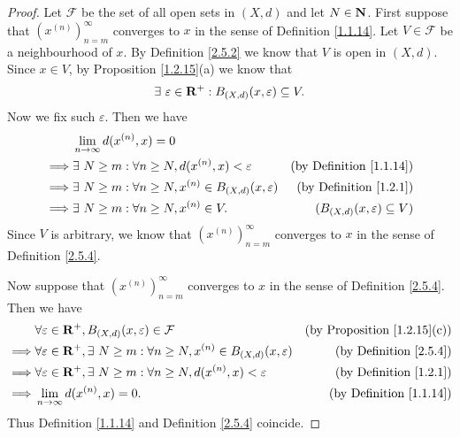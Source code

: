 \begin{proof}
    Let \(\mathcal{F}\) be the set of all open sets in \((X, d)\) and let \(N \in \mathbf{N}\).
    First suppose that \((x^{(n)})_{n = m}^\infty\) converges to \(x\) in the sense of Definition \ref{1.1.14}.
    Let \(V \in \mathcal{F}\) be a neighbourhood of \(x\).
    By Definition \ref{2.5.2} we know that \(V\) is open in \((X, d)\).
    Since \(x \in V\), by Proposition \ref{1.2.15}(a) we know that
    \[
        \exists\ \varepsilon \in \mathbf{R}^+ : B_{(X, d)}(x, \varepsilon) \subseteq V.
    \]
    Now we fix such \(\varepsilon\).
    Then we have
    \begin{align*}
                 & \lim_{n \to \infty} d(x^{(n)}, x) = 0                                                                                   \\
        \implies & \exists\ N \geq m : \forall n \geq N, d(x^{(n)}, x) < \varepsilon            & \text{(by Definition \ref{1.1.14})}      \\
        \implies & \exists\ N \geq m : \forall n \geq N, x^{(n)} \in B_{(X, d)}(x, \varepsilon) & \text{(by Definition \ref{1.2.1})}       \\
        \implies & \exists\ N \geq m : \forall n \geq N, x^{(n)} \in V.                         & (B_{(X, d)}(x, \varepsilon) \subseteq V)
    \end{align*}
    Since \(V\) is arbitrary, we know that \((x^{(n)})_{n = m}^\infty\) converges to \(x\) in the sense of Definition \ref{2.5.4}.

    Now suppose that \((x^{(n)})_{n = m}^\infty\) converges to \(x\) in the sense of Definition \ref{2.5.4}.
    Then we have
    \begin{align*}
                 & \forall \varepsilon \in \mathbf{R}^+, B_{(X, d)}(x, \varepsilon) \in \mathcal{F}                                   & \text{(by Proposition \ref{1.2.15}(c))} \\
        \implies & \forall \varepsilon \in \mathbf{R}^+, \exists\ N \geq m : \forall n \geq N, x^{(n)} \in B_{(X, d)}(x, \varepsilon) & \text{(by Definition \ref{2.5.4})}      \\
        \implies & \forall \varepsilon \in \mathbf{R}^+, \exists\ N \geq m : \forall n \geq N, d(x^{(n)}, x) < \varepsilon            & \text{(by Definition \ref{1.2.1})}      \\
        \implies & \lim_{n \to \infty} d(x^{(n)}, x) = 0.                                                                     & \text{(by Definition \ref{1.1.14})}
    \end{align*}
    Thus Definition \ref{1.1.14} and Definition \ref{2.5.4} coincide.
\end{proof}

